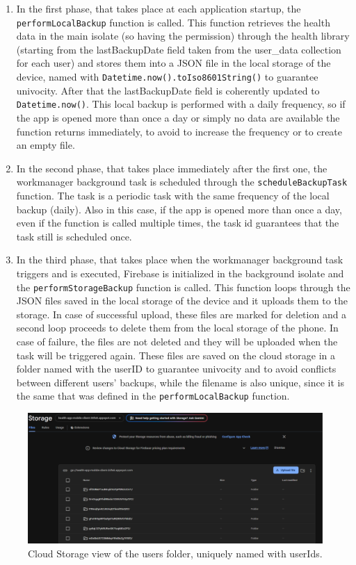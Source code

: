 \begin{enumerate}[nosep] %
    \item In the first phase, that takes place at each application startup, the \newline \texttt{performLocalBackup} function is called. This function retrieves the health data in the main isolate (so having the permission) through the health library (starting from the lastBackupDate field taken from the user\_data collection for each user) and stores them into a JSON file in the local storage of the device, named with \texttt{Datetime.now().toIso8601String()} to guarantee univocity. After that the lastBackupDate field is coherently updated to \texttt{Datetime.now()}. This local backup is performed with a daily frequency, so if the app is opened more than once a day or simply no data are available the function returns immediately, to avoid to increase the frequency or to create an empty file.
    \item In the second phase, that takes place immediately after the first one, the workmanager background task is scheduled through the \texttt{scheduleBackupTask} function. The task is a periodic task with the same frequency of the local backup (daily). Also in this case, if the app is opened more than once a day, even if the function is called multiple times, the task id guarantees that the task still is scheduled once.
    \item In the third phase, that takes place when the workmanager background task triggers and is executed, Firebase is initialized in the background isolate and the \texttt{performStorageBackup} function is called. This function loops through the JSON files saved in the local storage of the device and it uploads them to the storage. In case of successful upload, these files are marked for deletion and a second loop proceeds to delete them from the local storage of the phone. In case of failure, the files are not deleted and they will be uploaded when the task will be triggered again. These files are saved on the cloud storage in a folder named with the userID to guarantee univocity and to avoid conflicts between different users' backups, while the filename is also unique, since it is the same that was defined in the \texttt{performLocalBackup} function.
\end{enumerate}

\begin{figure}
    \includegraphics[width=1.0\linewidth]{./images/backup_users.jpg}
    \caption{Cloud Storage view of the users folder, uniquely named with userIds.}
\end{figure}

